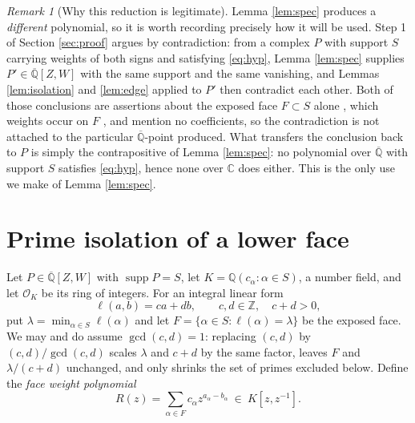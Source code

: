 \documentclass[11pt]{amsart}
\theoremstyle{plain}
\theoremstyle{remark}
\newtheorem{remark}[theorem]{Remark}
\numberwithin{equation}{section}
\DeclareMathOperator{\supp}{supp}
\newcommand{\C}{\mathbb{C}}
\newcommand{\Q}{\mathbb{Q}}
\newcommand{\Z}{\mathbb{Z}}
\newcommand{\Qbar}{\overline{\Q}}
\begin{document}
\begin{remark}[Why this reduction is legitimate]\label{rem:supportonly}
Lemma \ref{lem:spec} produces a \emph{different} polynomial, so it is worth
recording precisely how it will be used. Step 1 of Section \ref{sec:proof}
argues by contradiction: from a complex $P$ with support $S$ carrying weights of
both signs and satisfying \eqref{eq:hyp}, Lemma \ref{lem:spec} supplies
$P'\in\Qbar[Z,W]$ with the same support and the same vanishing, and Lemmas
\ref{lem:isolation} and \ref{lem:edge} applied to $P'$ then contradict each
other. Both of those conclusions are assertions about the exposed face
$F\subset S$ alone ,  which weights occur on $F$ ,  and mention no
coefficients, so the contradiction is not attached to the particular
$\Qbar$-point produced. What transfers the conclusion back to $P$ is simply the
contrapositive of Lemma \ref{lem:spec}: no polynomial over $\Qbar$ with support
$S$ satisfies \eqref{eq:hyp}, hence none over $\C$ does either. This is the only
use we make of Lemma \ref{lem:spec}.
\end{remark}

\section{Prime isolation of a lower face}\label{sec:isolation}

Let $P\in\Qbar[Z,W]$ with $\supp P=S$, let $K=\Q(c_\alpha:\alpha\in S)$, a
number field, and let $\mathcal O_K$ be its ring of integers. For an integral
linear form
\[
  \ell(a,b)=ca+db, \qquad c,d\in\Z,\quad c+d>0,
\]
put $\lambda=\min_{\alpha\in S}\ell(\alpha)$ and let
$F=\{\alpha\in S:\ell(\alpha)=\lambda\}$ be the exposed face. We may and do
assume $\gcd(c,d)=1$: replacing $(c,d)$ by $(c,d)/\gcd(c,d)$ scales $\lambda$
and $c+d$ by the same factor, leaves $F$ and $\lambda/(c+d)$ unchanged, and only
shrinks the set of primes excluded below. Define the \emph{face weight
polynomial}
\[
  R(z)=\sum_{\alpha\in F}c_\alpha z^{a_\alpha-b_\alpha}
  \ \in\ K[z,z^{-1}].
\]
\end{document}
